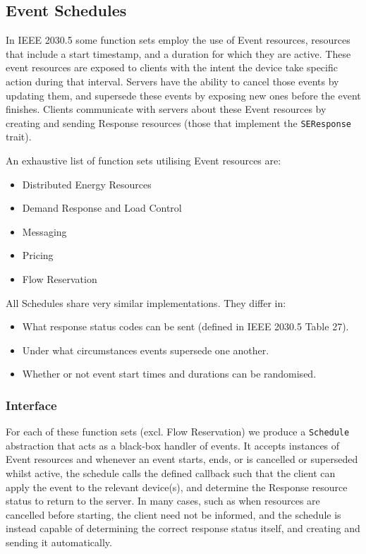 \subsection{Event Schedules}
In IEEE 2030.5 some function sets employ the use of Event resources, resources that include a start timestamp, and a duration for which they are active. These event resources are exposed to clients with the intent the device take specific action during that interval. Servers have the ability to cancel those events by updating them, and supersede these events by exposing new ones before the event finishes. Clients communicate with servers about these Event resources by creating and sending Response resources (those that implement the \texttt{SEResponse} trait).

An exhaustive list of function sets utilising Event resources are:

\begin{itemize}
    \item Distributed Energy Resources
    \item Demand Response and Load Control
    \item Messaging
    \item Pricing
    \item Flow Reservation
\end{itemize}

All Schedules share very similar implementations. They differ in:

\begin{itemize}
    \item What response status codes can be sent (defined in IEEE 2030.5 Table 27).
    \item Under what circumstances events supersede one another.
    \item Whether or not event start times and durations can be randomised.
\end{itemize}

\subsubsection{Interface}

For each of these function sets (excl. Flow Reservation) we produce a \texttt{Schedule} abstraction that acts as a black-box handler of events. It accepts instances of Event resources and whenever an event starts, ends, or is cancelled or superseded whilst active, the schedule calls the defined callback such that the client can apply the event to the relevant device(s), and determine the Response resource status to return to the server. In many cases, such as when resources are cancelled before starting, the client need not be informed, and the schedule is instead capable of determining the correct response status itself, and creating and sending it automatically.

